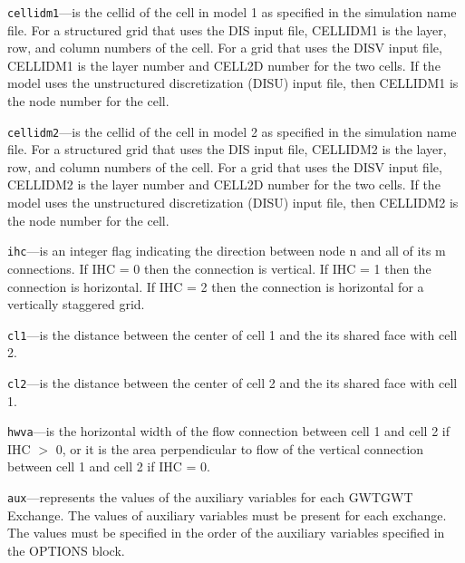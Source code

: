 \begin{description}
\item \texttt{cellidm1}---is the cellid of the cell in model 1 as specified in the simulation name file. For a structured grid that uses the DIS input file, CELLIDM1 is the layer, row, and column numbers of the cell.   For a grid that uses the DISV input file, CELLIDM1 is the layer number and CELL2D number for the two cells.  If the model uses the unstructured discretization (DISU) input file, then CELLIDM1 is the node number for the cell.

\item \texttt{cellidm2}---is the cellid of the cell in model 2 as specified in the simulation name file. For a structured grid that uses the DIS input file, CELLIDM2 is the layer, row, and column numbers of the cell.   For a grid that uses the DISV input file, CELLIDM2 is the layer number and CELL2D number for the two cells.  If the model uses the unstructured discretization (DISU) input file, then CELLIDM2 is the node number for the cell.

\item \texttt{ihc}---is an integer flag indicating the direction between node n and all of its m connections. If IHC = 0 then the connection is vertical.  If IHC = 1 then the connection is horizontal. If IHC = 2 then the connection is horizontal for a vertically staggered grid.

\item \texttt{cl1}---is the distance between the center of cell 1 and the its shared face with cell 2.

\item \texttt{cl2}---is the distance between the center of cell 2 and the its shared face with cell 1.

\item \texttt{hwva}---is the horizontal width of the flow connection between cell 1 and cell 2 if IHC $>$ 0, or it is the area perpendicular to flow of the vertical connection between cell 1 and cell 2 if IHC = 0.

\item \texttt{aux}---represents the values of the auxiliary variables for each GWTGWT Exchange. The values of auxiliary variables must be present for each exchange. The values must be specified in the order of the auxiliary variables specified in the OPTIONS block.

\end{description}

